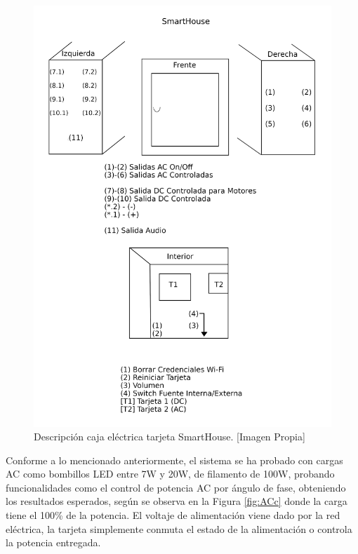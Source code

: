 \begin{figure}
	\centering
	\caption[Descripción caja eléctrica tarjeta SmartHouse.]{Descripción caja eléctrica tarjeta SmartHouse. [Imagen Propia]}
	\label{fig:labels}
	\includegraphics[width=0.7\linewidth]{Imagenes/labels}
\end{figure}

Conforme a lo mencionado anteriormente, el sistema se ha probado con cargas AC como bombillos LED entre 7W y 20W, de filamento de 100W, probando funcionalidades como el control de potencia AC por ángulo de fase, obteniendo los resultados esperados, según se observa en la Figura \ref{fig:ACc} donde la carga tiene el 100\% de la potencia. El voltaje de alimentación viene dado por la red eléctrica, la tarjeta simplemente conmuta el estado de la alimentación o controla la potencia entregada.\\

